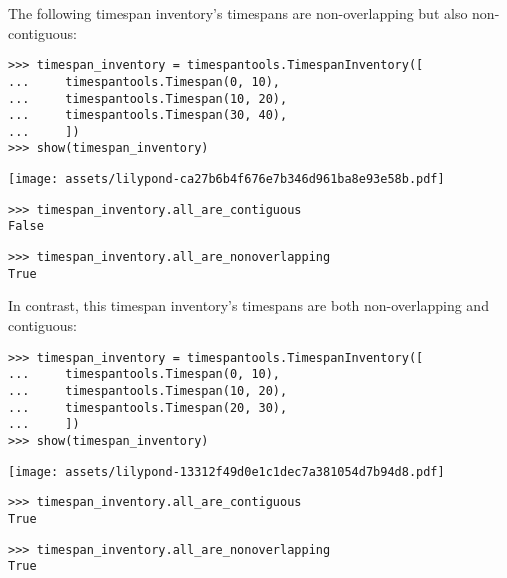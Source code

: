 \noindent The following timespan inventory's timespans are non-overlapping but
also non-contiguous:

\begin{comment}
<abjad>
timespan_inventory = timespantools.TimespanInventory([
    timespantools.Timespan(0, 10),
    timespantools.Timespan(10, 20),
    timespantools.Timespan(30, 40),
    ])
show(timespan_inventory)
timespan_inventory.all_are_contiguous
timespan_inventory.all_are_nonoverlapping
</abjad>
\end{comment}

\begin{singlespacing}
\vspace{-0.5\baselineskip}
\begin{lstlisting}
>>> timespan_inventory = timespantools.TimespanInventory([
...     timespantools.Timespan(0, 10),
...     timespantools.Timespan(10, 20),
...     timespantools.Timespan(30, 40),
...     ])
>>> show(timespan_inventory)
\end{lstlisting}
\noindent\texttt{[image: assets/lilypond-ca27b6b4f676e7b346d961ba8e93e58b.pdf]}
\begin{lstlisting}
>>> timespan_inventory.all_are_contiguous
False
\end{lstlisting}
\begin{lstlisting}
>>> timespan_inventory.all_are_nonoverlapping
True
\end{lstlisting}
\end{singlespacing}

\noindent In contrast, this timespan inventory's timespans are both
non-overlapping and contiguous:

\begin{comment}
<abjad>
timespan_inventory = timespantools.TimespanInventory([
    timespantools.Timespan(0, 10),
    timespantools.Timespan(10, 20),
    timespantools.Timespan(20, 30),
    ])
show(timespan_inventory)
timespan_inventory.all_are_contiguous
timespan_inventory.all_are_nonoverlapping
</abjad>
\end{comment}

\begin{singlespacing}
\vspace{-0.5\baselineskip}
\begin{lstlisting}
>>> timespan_inventory = timespantools.TimespanInventory([
...     timespantools.Timespan(0, 10),
...     timespantools.Timespan(10, 20),
...     timespantools.Timespan(20, 30),
...     ])
>>> show(timespan_inventory)
\end{lstlisting}
\noindent\texttt{[image: assets/lilypond-13312f49d0e1c1dec7a381054d7b94d8.pdf]}
\begin{lstlisting}
>>> timespan_inventory.all_are_contiguous
True
\end{lstlisting}
\begin{lstlisting}
>>> timespan_inventory.all_are_nonoverlapping
True
\end{lstlisting}
\end{singlespacing}

